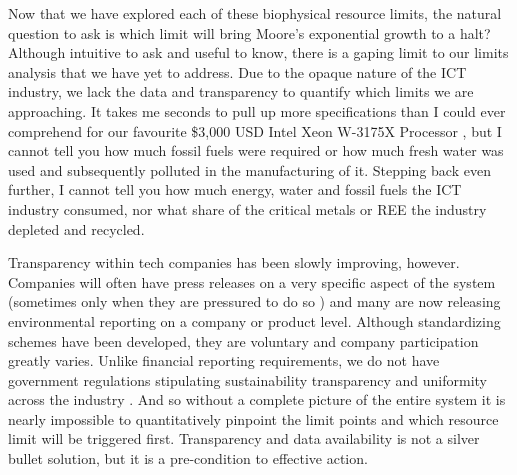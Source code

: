 \documentclass{article}
\begin{document}
Now that we have explored each of these biophysical resource limits, the natural question to ask is which limit will bring Moore's exponential growth to a halt? Although intuitive to ask and useful to know, there is a gaping limit to our limits analysis that we have yet to address. Due to the opaque nature of the ICT industry, we lack the data and transparency to quantify which limits we are approaching. It takes me seconds to pull up more specifications than I could ever comprehend for our favourite \$3,000 USD Intel Xeon W-3175X Processor \cite{intel2021processor}, but I cannot tell you how much fossil fuels were required or how much fresh water was used and subsequently polluted in the manufacturing of it. %
Stepping back even further, I cannot tell you how much energy, water and fossil fuels the ICT industry consumed, nor what share of the critical metals or REE the industry depleted and recycled. 

Transparency within tech companies has been slowly improving, however. Companies will often have press releases on a very specific aspect of the system (sometimes only when they are pressured to do so \cite{amazon2019openleter}) and many are now releasing environmental reporting on a company or product level. Although standardizing schemes have been developed, they are voluntary and company participation greatly varies. Unlike financial reporting requirements, we do not have government regulations stipulating sustainability transparency and uniformity across the industry \cite{mytton2019sustainabiliytransparency}. And so without a complete picture of the entire system it is nearly impossible to quantitatively pinpoint the limit points %
and which resource limit will be triggered first. Transparency and data availability is not a silver bullet solution, but it is a pre-condition to effective action.
\end{document}
